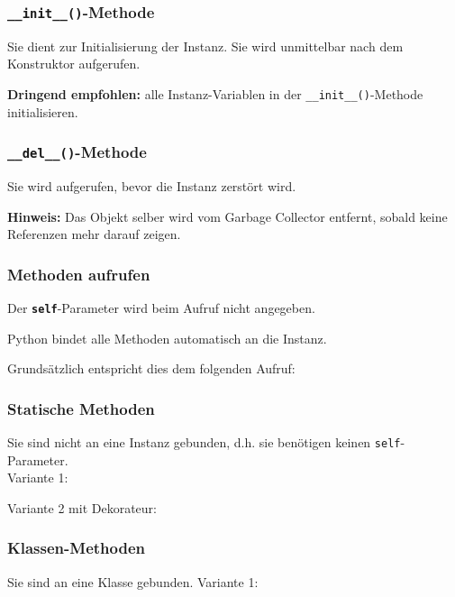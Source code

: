 \subsubsection{\texttt{\_\_init\_\_()}-Methode}
Sie dient zur Initialisierung der Instanz. Sie wird unmittelbar nach dem Konstruktor aufgerufen.

\textbf{Dringend empfohlen:} alle Instanz-Variablen in der \texttt{\_\_init\_\_()}-Methode initialisieren.

\subsubsection{\texttt{\_\_del\_\_()}-Methode}
Sie wird aufgerufen, bevor die Instanz zerstört wird.

\textbf{Hinweis:} Das Objekt selber wird vom Garbage Collector entfernt, sobald keine Referenzen mehr darauf zeigen.

\subsubsection{Methoden aufrufen}
Der \textbf{\texttt{self}}-Parameter wird beim Aufruf nicht angegeben.

Python bindet alle Methoden automatisch an die Instanz.

Grundsätzlich entspricht dies dem folgenden Aufruf:


\subsubsection{Statische Methoden}
Sie sind nicht an eine Instanz gebunden, d.h. sie benötigen keinen \texttt{self}-Parameter.\\
Variante 1:

Variante 2 mit Dekorateur:


\subsubsection{Klassen-Methoden}
Sie sind an eine Klasse gebunden.
Variante 1:


